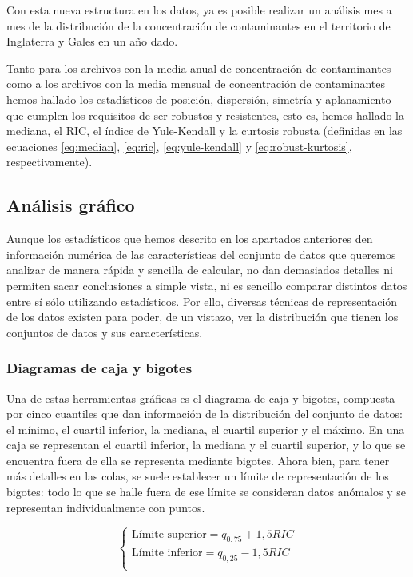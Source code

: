 \documentclass[12pt]{article}
\begin{document}
Con esta nueva estructura en los datos, ya es posible realizar un análisis mes a mes de la distribución de la concentración de contaminantes en el territorio de Inglaterra y Gales en un año dado.

Tanto para los archivos con la media anual de concentración de contaminantes como a los archivos con la media mensual de concentración de contaminantes hemos hallado los estadísticos de posición, dispersión, simetría y aplanamiento que cumplen los requisitos de ser robustos y resistentes, esto es, hemos hallado la mediana, el RIC, el índice de Yule-Kendall y la curtosis robusta (definidas en las ecuaciones \ref{eq:median}, \ref{eq:ric}, \ref{eq:yule-kendall} y \ref{eq:robust-kurtosis}, respectivamente).

\subsection{Análisis gráfico}

Aunque los estadísticos que hemos descrito en los apartados anteriores den información numérica de las características del conjunto de datos que queremos analizar de manera rápida y sencilla de calcular, no dan demasiados detalles ni permiten sacar conclusiones a simple vista, ni es sencillo comparar distintos datos entre sí sólo utilizando estadísticos. Por ello, diversas técnicas de representación de los datos existen para poder, de un vistazo, ver la distribución que tienen los conjuntos de datos y sus características.

\subsubsection{Diagramas de caja y bigotes}

Una de estas herramientas gráficas es el diagrama de caja y bigotes, compuesta por cinco cuantiles que dan información de la distribución del conjunto de datos: el mínimo, el cuartil inferior, la mediana, el cuartil superior y el máximo. En una caja se representan el cuartil inferior, la mediana y el cuartil superior, y lo que se encuentra fuera de ella se representa mediante bigotes. Ahora bien, para tener más detalles en las colas, se suele establecer un límite de representación de los bigotes: todo lo que se halle fuera de ese límite se consideran datos anómalos y se representan individualmente con puntos.

\begin{equation}
\begin{cases}
\text{Límite superior} = q_{0,75} + 1,5 RIC \\
\text{Límite inferior} = q_{0,25} - 1,5 RIC \\
\end{cases}
\label{boxplot_fence}
\end{equation}
\end{document}
